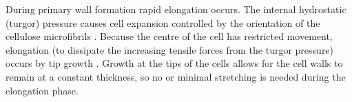 During primary wall formation rapid elongation occurs. The internal hydrostatic (turgor) pressure causes cell expansion controlled by the orientation of the cellulose microfibrils \citep{Tyerman_2002,16261190}.
Because the centre of the cell has restricted movement, elongation
(to dissipate the increasing tensile forces from the turgor pressure)
occurs by
tip growth \citep{taiz2006plant}. Growth at the tips of the cells allows for the cell walls to
remain at a constant thickness, so no or minimal stretching is needed during the elongation
phase.